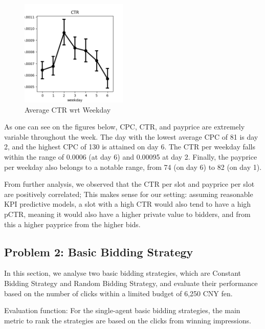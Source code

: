\documentclass{sig-alternate-05-2015}
\begin{document}
\begin{figure}
\centering
\includegraphics[height=2in, width=2in]{images/weekday_CTR.png}
\caption{Average CTR wrt Weekday}
\end{figure}

As one can see on the figures below, CPC, CTR, and payprice are extremely variable throughout the week.
The day with the lowest average CPC of 81 is day 2, and the highest CPC of 130 is attained on day 6.
The CTR per weekday falls within the range of 0.0006 (at day 6) and 0.00095 at day 2.
Finally, the payprice per weekday also belongs to a notable range, from 74 (on day 6) to 82 (on day 1).

From further analysis, we observed that the CTR per slot and payprice per slot are positively correlated;
This makes sense for our setting: assuming reasonable KPI predictive models, a slot with a high CTR would also tend to have a high pCTR,
meaning it would also have a higher private value to bidders, and from this a higher payprice from the higher bids.





\subsection{Problem 2: Basic Bidding Strategy}
In this section, we analyse two basic bidding strategies, which are Constant Bidding Strategy and Random Bidding Strategy, and evaluate their performance based on the number of clicks within a limited budget of 6,250 CNY fen. 

Evaluation function: For the single-agent basic bidding strategies, the main metric to rank the strategies are based on the clicks from winning impressions.
\end{document}
